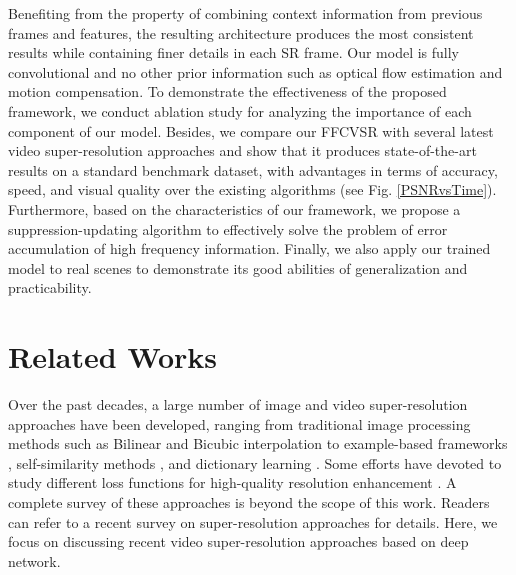 \documentclass[letterpaper]{article} %
\begin{document}
Benefiting from the property of combining context information from previous frames and features, the resulting architecture produces the most consistent results while containing finer details in each SR frame. Our model is fully convolutional and no other prior information such as optical flow estimation and motion compensation. To demonstrate the effectiveness of the proposed framework, we conduct ablation study for analyzing the importance of each component of our model. Besides, we compare our FFCVSR with several latest video super-resolution approaches and show that it produces state-of-the-art results on a standard benchmark dataset, with advantages in terms of accuracy, speed, and visual quality over the existing algorithms (see Fig. \ref{PSNRvsTime}). Furthermore, based on the characteristics of our framework, we propose a suppression-updating algorithm to effectively solve the problem of error accumulation of high frequency information. Finally, we also apply our trained model to real scenes to demonstrate its good abilities of generalization and practicability.


\section{Related Works}

Over the past decades, a large number of image and video super-resolution approaches have been developed, ranging from traditional image processing methods such as Bilinear and Bicubic interpolation to example-based frameworks \cite{Timofte2014Anchored,Jeong2015Multi,Xiong2013Example,Freedman2011TOG}, self-similarity methods \cite{Huang2015Single,Yang2010Exploiting}, and dictionary learning \cite{Perezpellitero2016PSyCo}. Some efforts have devoted to study different loss functions for high-quality resolution enhancement \cite{Sajjadi2017ICCV}. A complete survey of these approaches is beyond the scope of this work. Readers can refer to a recent survey \cite{Walha2016,Agustsson2017cvpr} on super-resolution approaches for details. Here, we focus on discussing recent video super-resolution approaches based on deep network.
\end{document}
